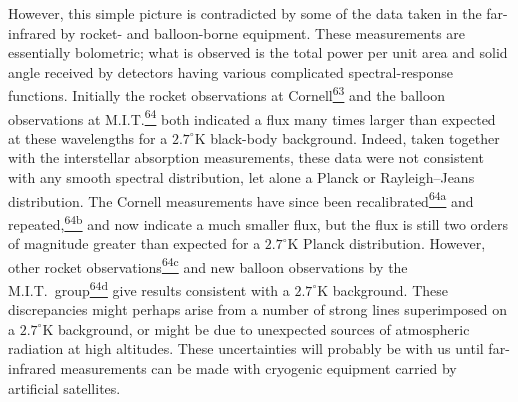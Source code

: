 However, this simple picture is contradicted by some of the data taken in the
far-infrared by rocket- and balloon-borne equipment. These measurements are
essentially bolometric; what is observed is the total power per unit area and
solid angle received by detectors having various complicated spectral-response
functions. Initially the rocket observations at
Cornell\hyperref[ch15-ref-63]{\textsuperscript{63}} and the balloon
observations at M.I.T.\hyperref[ch15-ref-64]{\textsuperscript{64}} both
indicated a flux many times larger than expected at these wavelengths for a
\(2.7^\circ\mathrm{K}\) black-body background. Indeed, taken together with the
interstellar absorption measurements, these data were not consistent with any
smooth spectral distribution, let alone a Planck or Rayleigh--Jeans
distribution. The Cornell measurements have since been
recalibrated\hyperref[ch15-ref-64a]{\textsuperscript{64a}} and
repeated,\hyperref[ch15-ref-64b]{\textsuperscript{64b}} and now indicate a
much smaller flux, but the flux is still two orders of magnitude greater than
expected for a \(2.7^\circ\mathrm{K}\) Planck distribution. However, other
rocket observations\hyperref[ch15-ref-64c]{\textsuperscript{64c}} and new
balloon observations by the M.I.T.\
group\hyperref[ch15-ref-64d]{\textsuperscript{64d}} give results consistent
with a \(2.7^\circ\mathrm{K}\) background. These discrepancies might perhaps
arise from a number of strong lines superimposed on a
\(2.7^\circ\mathrm{K}\) background, or might be due to unexpected sources of
atmospheric radiation at high altitudes. These uncertainties will probably be
with us until far-infrared measurements can be made with cryogenic equipment
carried by artificial satellites.

